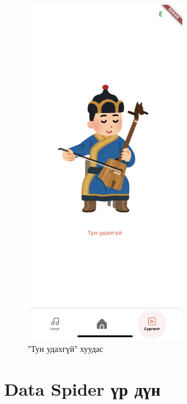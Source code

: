 \begin{figure}[h]
	\centering
	\includegraphics[height=15cm]{images/khuur-app2.jpg}
	\caption{"Тун удахгүй" хуудас}
	\label{fig:modalform}
\end{figure}
\pagebreak

\section{Data Spider үр дүн}

